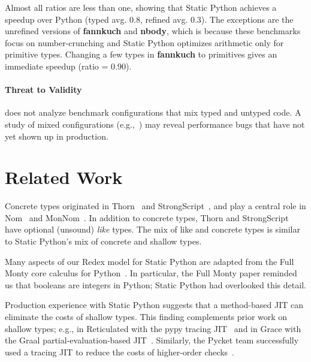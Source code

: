 \documentclass[english,cleveref,submission]{programming}
\newcommand{\SP}{Static Python}
\newcommand{\bmname}[1]{\textbf{#1}}
\begin{document}
Almost all ratios are less than one, showing that \SP{} achieves a speedup over
Python (typed avg. $0.8$, refined avg. $0.3$).
The exceptions are the unrefined versions of \bmname{fannkuch} and
\bmname{nbody}, which is because these benchmarks focus
on number-crunching and \SP{} optimizes arithmetic only for primitive types.
Changing a few types in \bmname{fannkuch} to primitives
gives an immediate speedup (ratio = $0.90$).


\paragraph{Threat to Validity}

 does not analyze benchmark configurations that mix
typed and untyped code. %
A study of mixed configurations (e.g.,~\cite{gm-pepm-2018,gtnffvf-jfp-2019})
may reveal performance bugs that have not yet shown up in production.


\section{Related Work}
\label{s:related}

Concrete types originated in Thorn~\cite{bfnorsvw-oopsla-2009,wnlov-popl-2010}
and StrongScript~\cite{rzv-ecoop-2015},
and play a central role in Nom~\cite{mt-oopsla-2017} and MonNom~\cite{mt-oopsla-2021}.
In addition to concrete types, Thorn and StrongScript have optional (unsound) \emph{like} types.
The mix of like and concrete types is similar to \SP{}'s mix of concrete and shallow
types.

Many aspects of our Redex model for \SP{} are adapted from the Full Monty core calculus
for Python~\cite{pmmwplck-oopsla-2013}.
In particular, the Full Monty paper reminded us that booleans are integers in Python;
\SP{} had overlooked this detail.

Production experience with \SP{} suggests that a method-based JIT can
eliminate the costs of shallow types.
This finding complements prior work on shallow types;
e.g., in Reticulated with the pypy tracing JIT~\cite{vsc-dls-2019}
and in Grace with the Graal partial-evaluation-based JIT~\cite{rmhn-ecoop-2019,grmhn-vmil-2019}.
Similarly, the Pycket team successfully used a tracing JIT to reduce the costs of higher-order
checks~\cite{bbst-oopsla-2017}.
\end{document}
